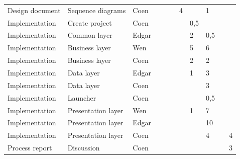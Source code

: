 \begin{table}
\begin{tabular}{lllllllllll}
		Design document & Sequence diagrams  & Coen                 &              &              &              & 4            &              & 1           &             &              \\
		Implementation  & Create project     & Coen                 &              &              &              &              & 0,5          &             &             &              \\
		Implementation  & Common layer       & Edgar                &              &              &              &              & 2            & 0,5         &             &              \\
		Implementation  & Business layer     & Wen                  &              &              &              &              & 5            & 6           &             &              \\
		Implementation  & Business layer     & Coen                 &              &              &              &              & 2            & 2           &             &              \\
		Implementation  & Data layer         & Edgar                &              &              &              &              & 1            & 3           &             &              \\
		Implementation  & Data layer         & Coen                 &              &              &              &              &              & 3           &             &              \\
		Implementation  & Launcher           & Coen                 &              &              &              &              &              & 0,5         &             &              \\
		Implementation  & Presentation layer & Wen                  &              &              &              &              & 1            & 7           &             &              \\
		Implementation  & Presentation layer & Edgar                &              &              &              &              &              & 10          &             &              \\
		Implementation  & Presentation layer & Coen                 &              &              &              &              &              & 4           &             & 4            \\
		Process report  & Discussion         & Coen                 &              &              &              &              &              &             &             & 3           
	\end{tabular}
\end{table}